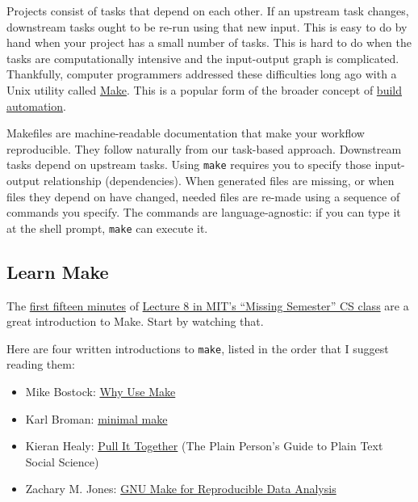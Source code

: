 Projects consist of tasks that depend on each other.
If an upstream task changes, downstream tasks ought to be re-run using that new input.
This is easy to do by hand when your project has a small number of tasks.
This is hard to do when the tasks are computationally intensive and the input-output graph is complicated.
Thankfully, computer programmers addressed these difficulties long ago with a Unix utility called \href{https://en.wikipedia.org/wiki/Make_(software)}{Make}.
This is a popular form of the broader concept of \href{https://tradediversion.net/2019/11/06/why-your-research-project-needs-build-automation/}{build automation}.

Makefiles are machine-readable documentation that make your workflow reproducible.
They follow naturally from our task-based approach.
Downstream tasks depend on upstream tasks.
Using \texttt{make} requires you to specify those input-output relationship (dependencies).
When generated files are missing, or when files they depend on have changed, needed files are re-made using a sequence of commands you specify.
The commands are language-agnostic: if you can type it at the shell prompt,
\texttt{make} can execute it.

\subsection{Learn Make}

The \href{https://www.youtube.com/watch?v=_Ms1Z4xfqv4}{first fifteen minutes} of
\href{https://missing.csail.mit.edu/2020/metaprogramming/}{Lecture 8 in MIT's ``Missing Semester'' CS class}
are a great introduction to Make.
Start by watching that.

Here are four written introductions to \texttt{make}, listed in the order that I suggest reading them:
\begin{itemize}
\item Mike Bostock: \href{https://bost.ocks.org/mike/make/}{Why Use Make}
\item Karl Broman: \href{http://kbroman.org/minimal_make/}{minimal make}
\item Kieran Healy: \href{http://plain-text.co/pull-it-together.html}{Pull It Together} (The Plain Person's Guide to Plain Text Social Science)
\item Zachary M. Jones: \href{https://web.archive.org/web/20240222042605/http://zmjones.com/make/}{GNU Make for Reproducible Data Analysis}
\end{itemize}

